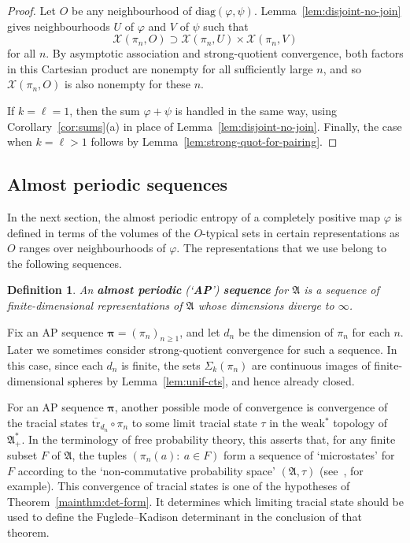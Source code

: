 \documentclass[12pt,a4paper]{article}
\numberwithin{equation}{section}
\newtheorem{dfn}[thm]{Definition}
\theoremstyle{remark}
\renewcommand{\rm}[1]{\mathrm{#1}}
\newcommand{\X}{\mathcal{X}}
\newcommand{\A}{\mathfrak{A}}
\renewcommand{\S}{\Sigma}
\renewcommand{\phi}{\varphi}
\newcommand{\bspi}{\boldsymbol{\pi}}
\newcommand{\tr}{\overline{\mathrm{tr}}}
\begin{document}
\begin{proof}
Let $O$ be any neighbourhood of $\rm{diag}(\phi,\psi)$.  Lemma~\ref{lem:disjoint-no-join} gives neighbourhoods $U$ of $\phi$ and $V$ of $\psi$ such that
\[\X(\pi_n,O) \supset \X(\pi_n,U) \times \X(\pi_n,V)\]
for all $n$.  By asymptotic association and strong-quotient convergence, both factors in this Cartesian product are nonempty for all sufficiently large $n$, and so $\X(\pi_n,O)$ is also nonempty for these $n$.

If $k=\ell = 1$, then the sum $\phi+\psi$ is handled in the same way, using Corollary~\ref{cor:sums}(a) in place of Lemma~\ref{lem:disjoint-no-join}. Finally, the case when $k=\ell > 1$ follows by Lemma~\ref{lem:strong-quot-for-pairing}.
\end{proof}






\subsection{Almost periodic sequences}\label{subs:AP}

In the next section, the almost periodic entropy of a completely positive map $\phi$ is defined in terms of the volumes of the $O$-typical sets in certain representations as $O$ ranges over neighbourhoods of $\phi$.  The representations that we use belong to the following sequences.

\begin{dfn}\label{dfn:AP}
An \textbf{almost periodic} (`\textbf{AP}') \textbf{sequence} for $\A$ is a sequence of finite-dimensional representations of $\A$ whose dimensions diverge to $\infty$.
\end{dfn}

Fix an AP sequence $\bspi = (\pi_n)_{n\ge 1}$, and let $d_n$ be the dimension of $\pi_n$ for each $n$.  Later we sometimes consider strong-quotient convergence for such a sequence.  In this case, since each $d_n$ is finite, the sets $\S_k(\pi_n)$ are continuous images of finite-dimensional spheres by Lemma~\ref{lem:unif-cts}, and hence already closed.

For an AP sequence $\bspi$, another possible mode of convergence is convergence of the tracial states $\tr_{d_n}\circ \pi_n$ to some limit tracial state $\tau$ in the weak$^\ast$ topology of $\A_+^\ast$.  In the terminology of free probability theory, this asserts that, for any finite subset $F$ of $\A$, the tuples $(\pi_n(a):\ a \in F)$ form a sequence of `microstates' for $F$ according to the `non-commutative probability space' $(\A,\tau)$ (see~\cite{Voi02--survey}, for example).  This convergence of tracial states is one of the hypotheses of Theorem~\ref{mainthm:det-form}.  It determines which limiting tracial state should be used to define the Fuglede--Kadison determinant in the conclusion of that theorem.
\end{document}
